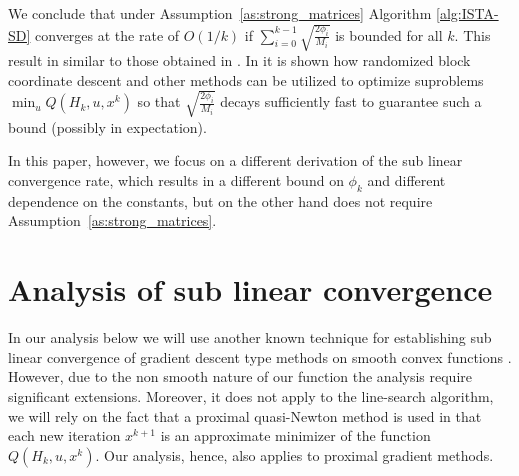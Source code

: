 \documentclass[11pt]{article}
\numberwithin{equation}{section}
\begin{document}
We conclude that under Assumption~\ref{as:strong_matrices} Algorithm \ref{alg:ISTA-SD} converges at the rate of $O(1/k)$ if 
$\sum_{i=0}^{k-1} \sqrt{\frac{2\phi_i}{M_i}}$ is bounded for all $k$. This result in similar to those obtained in \cite{Schmidtetal}.
In \cite{OML} it is shown how randomized block coordinate descent and other methods can be utilized to optimize suproblems 
$\min_u Q(H_k,u, x^k)$
so that  $\sqrt{\frac{2\phi_i}{M_i}}$ decays sufficiently fast to guarantee  such a bound (possibly in expectation).

In this paper, however, we focus on a different derivation of the sub linear convergence rate, which results in a different bound on $\phi_k$
and different dependence on the constants, but on the other hand does not require Assumption~\ref{as:strong_matrices}. 

\section{Analysis of sub linear convergence}
In our analysis below we will use another known technique for establishing sub linear convergence of  gradient descent type methods
on smooth convex functions \cite{Cartisetal2012}. However, due to the non smooth nature of our function the analysis require significant extensions. Moreover, it does not apply to the line-search algorithm, we will rely on the fact that a proximal quasi-Newton method is used in that each new iteration $x^{k+1}$ is an approximate minimizer of the function $Q(H_k, u, x^k)$. Our analysis, hence, also applies to proximal gradient methods. 
\end{document}
